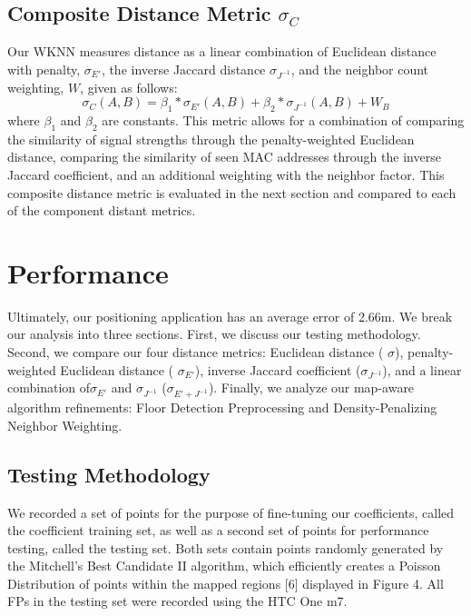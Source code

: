 \documentclass[conference]{IEEEtran}
\begin{document}
\subsection{Composite Distance Metric $\sigma_C$}
\indent Our WKNN measures distance as a linear combination of Euclidean distance with penalty, $\sigma_{E'}$,  the inverse Jaccard distance $\sigma_{J^{-1}}$, and the neighbor count weighting, $W$,  given as follows:
\begin{equation}
\label{composite}
\sigma_C(A, B)=\beta_1*\sigma_{E'}(A, B)+\beta_2*\sigma_{J^{-1}}(A, B)+W_B
\end{equation}
\indent where $\beta_1$ and $\beta_2$ are constants. This metric allows for a combination of comparing the similarity of signal strengths through the penalty-weighted Euclidean distance, comparing the similarity of seen MAC addresses through the inverse Jaccard coefficient, and an additional weighting with the neighbor factor. This composite distance metric is evaluated in the next section and compared to each of the component distant metrics.

\section{Performance}

Ultimately, our positioning application has an average error of 2.66m. We break our analysis into three sections. First, we discuss our testing methodology. Second, we compare our four distance metrics: Euclidean distance ( $\sigma$), penalty-weighted Euclidean distance ( $\sigma_{E'}$), inverse Jaccard coefficient ($\sigma_{J^{-1}}$), and a linear combination of$\sigma_{E'}$ and $\sigma_{J^{-1}}$ ($\sigma_{E' + J^{-1}}$). Finally, we analyze our map-aware algorithm refinements: Floor Detection Preprocessing and Density-Penalizing Neighbor Weighting.

\subsection{Testing Methodology}
We recorded a set of points for the purpose of fine-tuning our coefficients, called the coefficient training set, as well as a second set of points for performance testing, called the testing set. Both sets contain points randomly generated by the Mitchell's Best Candidate II algorithm, which efficiently creates a Poisson Distribution of points within the mapped regions [6] displayed in Figure 4. All FPs in the testing set were recorded using the HTC One m7. 
\end{document}
